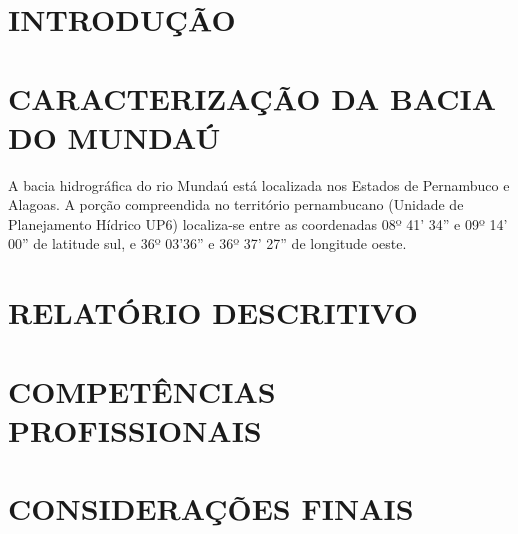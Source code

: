 \documentclass[12pt,a4paper]{article}
\begin{document}
\newpage


\tableofcontents
\newpage
\section{INTRODUÇÃO}


\section{CARACTERIZAÇÃO DA BACIA DO MUNDAÚ}

A bacia hidrográfica do rio Mundaú está localizada nos Estados de Pernambuco e Alagoas. A porção compreendida no território pernambucano (Unidade de Planejamento Hídrico UP6) localiza-se entre as coordenadas 08º 41’ 34” e 09º 14’ 00” de latitude sul, e 36º 03’36” e 36º 37’ 27” de longitude oeste.


\section{RELATÓRIO DESCRITIVO}


\section{COMPETÊNCIAS PROFISSIONAIS}


\section{CONSIDERAÇÕES FINAIS}


\end{document}
